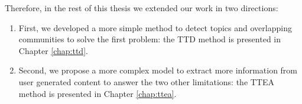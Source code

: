 Therefore, in the rest of this thesis we extended our work in two directions:

\begin{enumerate}
 \item First, we developed a more simple method to detect topics and overlapping communities to solve the first problem: the TTD method is presented in Chapter \ref{chap:ttd}.
  \item Second, we propose a more complex model to extract more information from user generated content to answer the two other limitations: the TTEA method is presented in Chapter \ref{chap:ttea}.
\end{enumerate}
 
